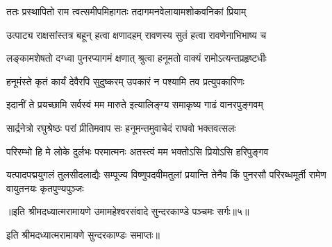 \twolineshloka
{ततः प्रस्थापितो राम त्वत्समीपमिहागतः}
{तदागमनवेलायामशोकवनिकां प्रियाम्} %

\twolineshloka
{उत्पाट्य राक्षसांस्तत्र बहून् हत्वा क्षणादहम्}
{रावणस्य सुतं हत्वा रावणेनाभिभाष्य च} %

\twolineshloka
{लङ्कामशेषतो दग्ध्वा पुनरप्यागमं क्षणात्}
{श्रुत्वा हनूमतो वाक्यं रामोऽत्यन्तप्रहृष्टधीः} %

\twolineshloka
{हनूमंस्ते कृतं कार्यं देवैरपि सुदुष्करम्}
{उपकारं न पश्यामि तव प्रत्युपकारिणः} %

\twolineshloka
{इदानीं ते प्रयच्छामि सर्वस्वं मम मारुते}
{इत्यालिङ्ग्य समाकृष्य गाढं वानरपुङ्गवम्} %

\twolineshloka
{सार्द्रनेत्रो रघुश्रेष्ठः परां प्रीतिमवाप सः}
{हनूमन्तमुवाचेदं राघवो भक्तवत्सलः} %

\twolineshloka
{परिरम्भो हि मे लोके दुर्लभः परमात्मनः}
{अतस्त्वं मम भक्तोऽसि प्रियोऽसि हरिपुङ्गव} %

\fourlineindentedshloka
{यत्पादपद्मयुगलं तुलसीदलाद्यैः}
{सम्पूज्य विष्णुपदवीमतुलां प्रयान्ति}
{तेनैव किं पुनरसौ परिरब्धमूर्ती}
{रामेण वायुतनयः कृतपुण्यपुञ्जः} %

{॥इति श्रीमदध्यात्मरामायणे उमामहेश्वरसंवादे सुन्दरकाण्डे
पञ्चमः सर्गः॥५॥
}

इति श्रीमदध्यात्मरामायणे सुन्दरकाण्डः समाप्तः॥